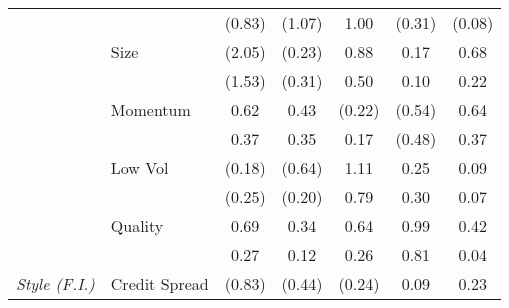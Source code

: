 \documentclass[12pt]{article}
\begin{document}
\begin{table}[H]
{\begin{tabular}{@{}llccccc@{}}
                              &                   & {\color[HTML]{303498} (0.83)}         & {\color[HTML]{303498} (1.07)}   & {\color[HTML]{303498} 1.00}          & {\color[HTML]{303498} (0.31)}   & {\color[HTML]{303498} (0.08)}        \\
                              & Size              & (2.05)                                & (0.23)                          & 0.88                                 & 0.17                            & 0.68                                 \\
                              &                   & {\color[HTML]{303498} (1.53)}         & {\color[HTML]{303498} (0.31)}   & {\color[HTML]{303498} 0.50}          & {\color[HTML]{303498} 0.10}     & {\color[HTML]{303498} 0.22}          \\
                              & Momentum          & 0.62                                  & 0.43                            & (0.22)                               & (0.54)                          & 0.64                                 \\
                              &                   & {\color[HTML]{303498} 0.37}           & {\color[HTML]{303498} 0.35}     & {\color[HTML]{303498} 0.17}          & {\color[HTML]{303498} (0.48)}   & {\color[HTML]{303498} 0.37}          \\
                              & Low Vol           & (0.18)                                & (0.64)                          & 1.11                                 & 0.25                            & 0.09                                 \\
                              &                   & {\color[HTML]{303498} (0.25)}         & {\color[HTML]{303498} (0.20)}   & {\color[HTML]{303498} 0.79}          & {\color[HTML]{303498} 0.30}     & {\color[HTML]{303498} 0.07}          \\
                              & Quality           & 0.69                                  & 0.34                            & 0.64                                 & 0.99                            & 0.42                                 \\
                              &                   & {\color[HTML]{303498} 0.27}           & {\color[HTML]{303498} 0.12}     & {\color[HTML]{303498} 0.26}          & {\color[HTML]{303498} 0.81}     & {\color[HTML]{303498} 0.04}          \\ \midrule
\textit{Style (F.I.)}         & Credit Spread     & (0.83)                                & (0.44)                          & (0.24)                               & 0.09                            & 0.23                                 \\

\end{tabular}}
\end{table}
\end{document}
